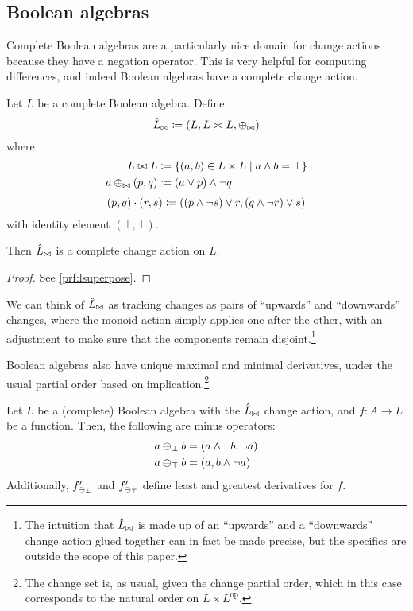 \subsection{Boolean algebras}
\label{sec:booleanAlgebras}

Complete Boolean algebras are a particularly nice domain for change actions
because they have a negation operator. This is very helpful for computing
differences, and indeed Boolean algebras have a complete change action.

\begin{prop}[name=Boolean algebra change actions, restate=lsuperpose]
 Let $L$ be a complete Boolean algebra. Define
  \begin{displaymath}
    \hat{L}_{\bowtie} \coloneqq (L,L \bowtie L,\oplus_{\bowtie})
  \end{displaymath}
  where
  \begin{align*}
    L \bowtie L &\coloneqq \{ (a, b) \in L \times L \mid a \wedge b = \bot \}\\
    a \oplus_{\bowtie} (p, q) &\coloneqq (a \vee p) \wedge \neg q
  \end{align*}
  \begin{displaymath}
    (p, q) \cdot (r, s) \coloneqq ((p \wedge \neg s) \vee r, (q \wedge \neg r) \vee s)
  \end{displaymath}
  with identity element $(\bot, \bot)$.

  Then $\hat{L}_{\bowtie}$ is a complete change action on $L$.
\end{prop}
\ifproofs
\begin{proof}
  See \cref{prf:lsuperpose}.
\end{proof}
\fi

We can think of $\hat{L}_{\bowtie}$ as tracking changes as pairs of ``upwards'' and
``downwards'' changes, where the monoid action simply applies one after the
other, with an adjustment to make sure that the components remain disjoint.\footnote{
  The intuition that $\hat{L}_{\bowtie}$ is made up of an ``upwards''
  and a ``downwards'' change action glued together can in fact be made precise, but the specifics
  are outside the scope of this paper.}

Boolean algebras also have unique maximal and minimal
derivatives, under the usual partial order based on implication.\footnote{The change
set is, as usual, given the change partial order, which in this case corresponds to
the natural order on $L \times L^{\textrm{op}}$.}

\begin{prop}
  \label{prop:minimalMaximalDerivatives}
  Let $L$ be a (complete) Boolean algebra with the $\hat{L}_{\bowtie}$ change action, and
  $f: A \rightarrow L$ be a function.
  Then, the following are minus operators:
  \begin{align*}
    a \ominus_\bot b &= (a \wedge \neg b, \neg a)\\
    a \ominus_\top b &= (a, b \wedge \neg a)
  \end{align*}
  Additionally, $f'_{\ominus_{\bot}}$ and $f'_{\ominus_{\top}}$ 
  define least and greatest derivatives for $f$.
\end{prop}

